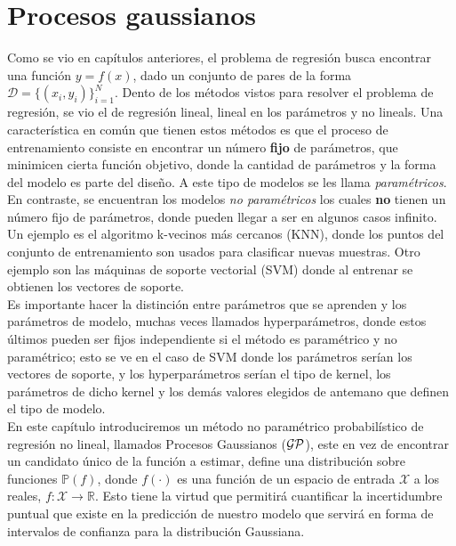 
\section{Procesos gaussianos}


Como se vio en capítulos anteriores, el problema de regresión busca encontrar una función $y= f(x)$, dado un conjunto de pares de la forma $\mathcal{D}=\{(x_i, y_i)\}_{i=1}^N$. Dento de los métodos vistos para resolver el problema de regresión, se vio el de regresión lineal, lineal en los parámetros y no lineals. Una característica en común que tienen estos métodos es que el proceso de entrenamiento consiste en encontrar un número \textbf{fijo} de parámetros, que minimicen cierta función objetivo, donde la cantidad de parámetros y la forma del modelo es parte del diseño. A este tipo de modelos se les llama \textit{paramétricos}.\\

En contraste, se encuentran los modelos \textit{no paramétricos} los cuales \textbf{no} tienen un número fijo de parámetros, donde pueden llegar a ser en algunos casos infinito. Un ejemplo es el algoritmo k-vecinos más cercanos (KNN), donde los puntos del conjunto de entrenamiento son usados para clasificar nuevas muestras. Otro ejemplo son las máquinas de soporte vectorial (SVM) donde al entrenar se obtienen los vectores de soporte.\\

Es importante hacer la distinción entre parámetros que se aprenden y los parámetros de modelo, muchas veces llamados hyperparámetros, donde estos últimos pueden ser fijos independiente si el método es paramétrico y no paramétrico; esto se ve en el caso de SVM donde los parámetros serían los vectores de soporte, y los hyperparámetros serían el tipo de kernel, los parámetros de dicho kernel y los demás valores elegidos de antemano que definen el tipo de modelo.\\

En este capítulo introduciremos un método no paramétrico probabilístico de regresión no lineal, llamados Procesos Gaussianos ($\mathcal{GP}$), este en vez de encontrar un candidato único de la función a estimar, define una distribución sobre funciones $\mathbb{P}(f)$, donde $f(\cdot)$ es una función de un espacio de entrada $\mathcal{X}$ a los reales, $f: \mathcal{X} \rightarrow \mathbb{R}$. Esto tiene la virtud que permitirá cuantificar la incertidumbre puntual que existe en la predicción de nuestro modelo que servirá en forma de intervalos de confianza para la distribución Gaussiana.\\

